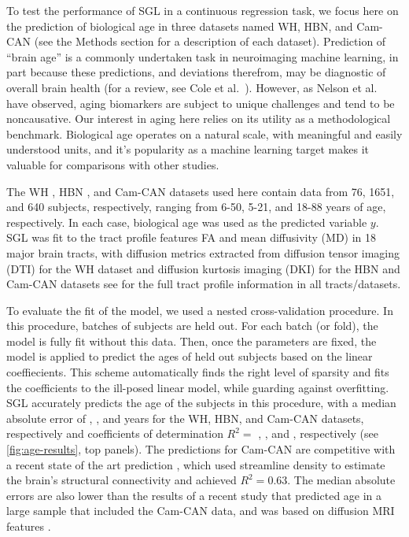 \documentclass[10pt,letterpaper]{article}
\begin{document}
To test the performance of SGL in a continuous
regression task, we focus here on the prediction of biological age in three
datasets named WH, HBN, and Cam-CAN (see the Methods section for a description of each dataset). Prediction of ``brain
age'' is a commonly undertaken task in neuroimaging machine learning, in part
because these predictions, and deviations therefrom, may be diagnostic of
overall brain health (for a review, see Cole et al.~\cite{Cole2019-rz}).
However, as Nelson et al.~\cite{nelson2019biomarkers} have observed, aging
biomarkers are subject to unique challenges and tend to be noncausative. Our
interest in aging here relies on its utility as a methodological benchmark.
Biological age operates on a natural scale, with meaningful and easily
understood units, and it's popularity as a machine learning target makes it
valuable for comparisons with other studies.

The WH \cite{yeatman2014lifespan}, HBN \cite{alexander2017open}, and Cam-CAN
\cite{shafto2014cambridge,taylor2017cambridge} datasets used here contain
data from 76, 1651, and 640 subjects, respectively, ranging from 6-50, 5-21,
and 18-88 years of age, respectively. In each case, biological age was used
as the predicted variable $y$. SGL was fit to the tract profile
features FA and mean diffusivity (MD) in 18 major brain tracts, with diffusion metrics extracted
from diffusion tensor imaging (DTI) for the WH dataset and diffusion kurtosis
imaging (DKI) \cite{jensen2005diffusion} for the HBN and Cam-CAN datasets
see  for the full tract profile information in all tracts/datasets.

To evaluate the fit of the model, we used a nested cross-validation
procedure. In this procedure, batches of subjects are held out. For each
batch (or fold), the model is fully fit without this data. Then, once the
parameters are fixed, the model is applied to predict the ages of held out
subjects based on the linear coeffiecients. This scheme automatically finds
the right level of sparsity and fits the coefficients to the ill-posed linear
model, while guarding against overfitting. SGL accurately predicts the age of
the subjects in this procedure, with a median absolute error of {\whMae},
{\hbnMae}, and {\camcanMae} years for the WH, HBN, and Cam-CAN datasets,
respectively and coefficients of determination $R^2 = $ {\whRsq} , {\hbnRsq}, and {\camcanRsq},
respectively (see \cref{fig:age-results}, top panels). The
predictions for Cam-CAN are competitive with a recent state of the art
prediction \cite{mcpherson2020single}, which used streamline density to
estimate the brain's structural connectivity and achieved $R^2 = 0.63$. The
median absolute errors are also lower than the results of a recent study that
predicted age in a large sample that included the Cam-CAN data, and was based
on diffusion MRI features \cite{Richard2018-ux}.
\end{document}
